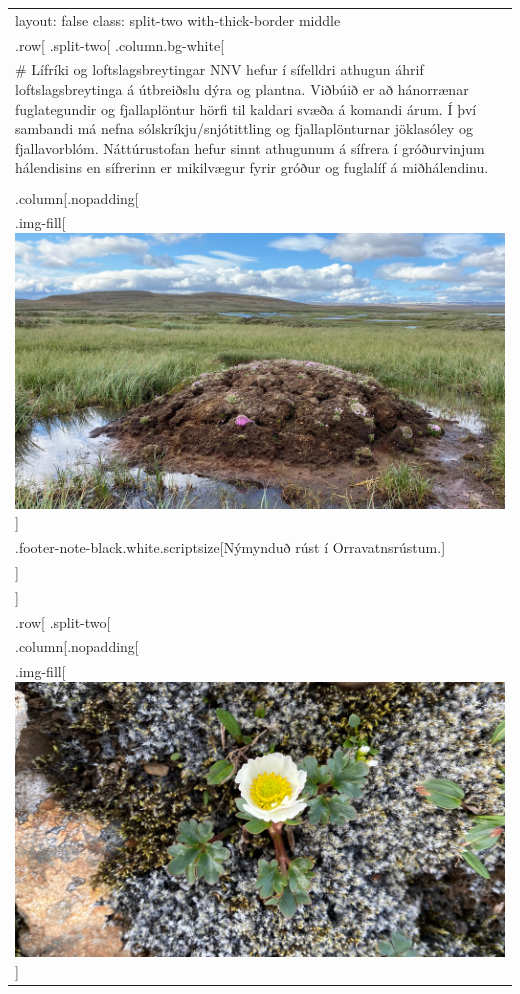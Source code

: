 \documentclass[
]{article}
\begin{document}
\begin{longtable}[]{@{}
  >{\raggedright\arraybackslash}p{}@{}}
\toprule
\endhead
layout: false class: split-two with-thick-border middle \\
.row{[} .split-two{[} .column.bg-white{[} \\
\# Lífríki og loftslagsbreytingar NNV hefur í sífelldri athugun áhrif
loftslagsbreytinga á útbreiðslu dýra og plantna. Viðbúið er að
hánorrænar fuglategundir og fjallaplöntur hörfi til kaldari svæða á
komandi árum. Í því sambandi má nefna sólskríkju/snjótittling og
fjallaplönturnar jöklasóley og fjallavorblóm. Náttúrustofan hefur sinnt
athugunum á sífrera í gróðurvinjum hálendisins en sífrerinn er
mikilvægur fyrir gróður og fuglalíf á miðhálendinu. \\
{]} \\
.column{[}.nopadding{[} \\
.img-fill{[}\includegraphics{myndir/breyttar/rust.JPEG}{]} \\
.footer-note-black.white.scriptsize{[}Nýmynduð rúst í
Orravatnsrústum.{]} \\
{]} {]} \\
{]} {]} \\
.row{[} .split-two{[} \\
.column{[}.nopadding{[} \\
.img-fill{[}\includegraphics{myndir/breyttar/joklasoley.JPEG}{]} \\

\end{longtable}
\end{document}
